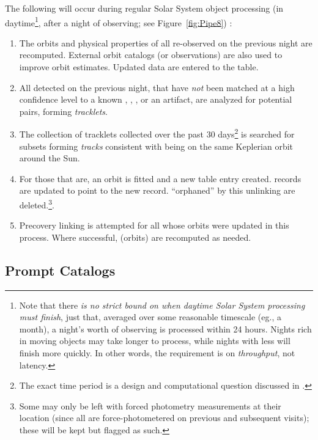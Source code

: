 \documentclass[SE,lsstdraft,toc]{lsstdoc}
\begin{document}
The following will occur during regular Solar System object processing (in daytime\footnote{Note that there \emph{is no strict bound on when daytime Solar System processing must finish}, just that, averaged over some reasonable timescale (eg., a month), a night's worth of observing is processed within 24 hours. Nights rich in moving objects may take longer to process, while nights with less will finish more quickly. In other words, the requirement is on \emph{throughput}, not latency.}, after a night of observing; see Figure~\ref{fig:Pipe8}) :
\begin{enumerate}
\item The orbits and physical properties of all \SSObjects re-observed on the previous night are recomputed. External orbit catalogs (or observations) are also used to improve orbit estimates. Updated data are entered to the \SSObjects table.
\item All \DIASources detected on the previous night, that have \emph{not} been matched at a high confidence level to a known \Object,
\DIAObject, \SSObject, or an artifact, are analyzed for potential pairs, forming \emph{tracklets}.
\item The collection of tracklets collected over the past 30 days\footnote{The exact time period is a design and computational question discussed in .} is searched for subsets forming \emph{tracks} consistent with being on the same Keplerian orbit around the Sun.
\item For those that are, an orbit is fitted and a new \SSObject table entry created. \DIASource records are updated to point to the new \SSObject record. \DIAObjects ``orphaned'' by this unlinking are deleted.\footnote{Some \DIAObjects may only be left with forced photometry measurements at their location (since all \DIAObjects are force-photometered on previous and subsequent visits);  these will be kept but flagged as such.}.
\item Precovery linking is attempted for all \SSObjects whose orbits were updated in this process. Where successful, \SSObjects (orbits) are recomputed as needed.
\end{enumerate}

\subsection{Prompt Catalogs}
\label{sec:level1db}
\end{document}
